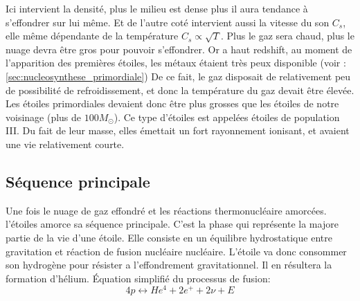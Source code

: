 Ici intervient la densité, plus le milieu est dense plus il aura tendance à s'effondrer sur lui même.
Et de l'autre coté intervient aussi la vitesse du son $C_s$, elle même dépendante de la température $C_s \propto \sqrt{T}$.
Plus le gaz sera chaud, plus le nuage devra être gros pour pouvoir s’effondrer.
Or a haut redshift, au moment de l'apparition des premières étoiles, les métaux étaient très peux disponible  (voir :\ref{sec:nucleosynthese_primordiale})
De ce fait, le gaz disposait de relativement peu de possibilité de refroidissement, et donc la température du gaz devait être élevée.
Les étoiles primordiales devaient donc être plus grosses que les étoiles de notre voisinage (plus de $100M_\odot$).
Ce type d'étoiles est appelées étoiles de population III.
Du fait de leur masse, elles émettait un fort rayonnement ionisant, et avaient une vie relativement courte.

%

\subsection{Séquence principale}


Une fois le nuage de gaz effondré et les réactions thermonucléaire amorcées.
l'étoiles amorce sa séquence principale.
C'est la phase qui représente la majore partie de la vie d'une étoile.
Elle consiste en un équilibre hydrostatique entre gravitation et réaction de fusion nucléaire nucléaire.
L'étoile va donc consommer son hydrogène pour résister a l'effondrement gravitationnel.
Il en résultera la formation d'hélium.
Équation simplifié du processus de fusion:
\begin{equation}
4p \leftrightarrow He^4 + 2e^+ + 2\nu + E
\end{equation}

